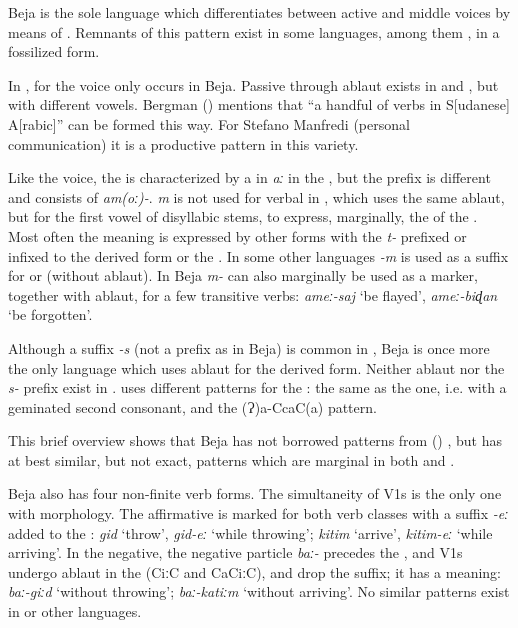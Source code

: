 \documentclass[output=paper]{langsci/langscibook}
\begin{document}
Beja is the sole  language which differentiates between active and middle voices by means of . Remnants of this pattern exist in some  languages, among them , in a fossilized form. 

In ,  for the  voice only occurs in Beja. Passive  through ablaut exists in  and  , but with different vowels. Bergman (\citeyear[34]{Bergman2002}) mentions that “a handful of verbs in S[udanese] A[rabic]” can be formed this way. For Stefano Manfredi (personal communication) it is a productive pattern in this  variety.

Like the  voice, the  is characterized by a  in \textit{aː} in the , but the prefix is different and consists of \textit{am(oː)-}. \textit{m} is not used for verbal  in , which uses the same ablaut, but for the first vowel of disyllabic stems, to express, marginally, the  of the . Most often the  meaning is expressed by other forms with the \textit{t-} prefixed or infixed to the derived form or the . In some other  languages \textit{\nobreakdash-m} is used as a suffix for  or  (without ablaut). In Beja \textit{m-} can also marginally be used as a  marker, together with ablaut, for a few transitive  verbs: \textit{ameː\nobreakdash-saj} ‘be flayed’, \textit{ameː\nobreakdash-biɖan} ‘be forgotten’.

Although a suffix \textit{{}-s} (not a prefix as in Beja) is common in , Beja is once more the only  language which uses ablaut for the  derived form. Neither ablaut nor the \textit{s-} prefix exist in .  uses different patterns for the : the same as the  one, i.e. with a geminated second  consonant, and the (Ɂ)a-CcaC(a) pattern.

This brief overview shows that Beja has not borrowed patterns from () , but has at best similar, but not exact,  patterns which are marginal in both  and  .

Beja also has four non-finite verb forms. The simultaneity  of V1s is the only one with  morphology. The affirmative  is marked for both verb classes with a suffix \textit{{}-eː} added to the : \textit{gid} ‘throw’, \textit{gid\nobreakdash-eː} ‘while throwing’; \textit{kitim} ‘arrive’, \textit{kitim-eː} ‘while arriving’. In the negative, the negative particle \textit{baː-} precedes the , and V1s undergo ablaut in the  (CiːC and CaCiːC), and drop the suffix; it has a  meaning: \textit{baː-giːd} ‘without throwing’; \textit{baː-katiːm} ‘without arriving’. No similar patterns exist in  or other  languages.
\end{document}
